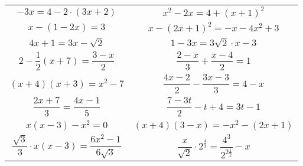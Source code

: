\documentclass[a4paper,12pt,leqno,fleqn]{article}
\begin{document}
\begin{tabularx}{\linewidth}{@{}XX@{}}

  \begin{equation}
    -3x=4-2\cdot(3x+2)
  \end{equation}
&
  \begin{equation}
    x^2-2x=4+(x+1)^2
  \end{equation}
\\
  \begin{equation}
    x-(1-2x)=3
  \end{equation}
&
  \begin{equation}
    x-(2x+1)^2=-x-4x^2+3
  \end{equation}
\\
  \begin{equation}
    4x+1=3x-\sqrt{2}
  \end{equation}
&
  \begin{equation}
    1-3x=3\sqrt{2}\cdot x-3
  \end{equation}
\\
  \begin{equation}
    2-\frac{1}{2}(x+7)=\frac{3-x}{2}
  \end{equation}
&
  \begin{equation}
    \frac{2-x}{3}+\frac{x-4}{2}=1
  \end{equation}
\\
  \begin{equation}
    (x+4)(x+3)=x^2-7
  \end{equation}
&
  \begin{equation}
    \frac{4x-2}{2}-\frac{3x-3}{3}=4-x
  \end{equation}
\\
  \begin{equation}
    \frac{2x+7}{3}=\frac{4x-1}{5}
  \end{equation}
&
  \begin{equation}
    \frac{7-3t}{2}-t+4=3t-1
  \end{equation}
\\
  \begin{equation}
    x(x-3)-x^2=0
  \end{equation}
&
  \begin{equation}
    (x+4)(3-x)=-x^2-(2x+1)
  \end{equation}
\\
  \begin{equation}
    \frac{\sqrt{3}}{3}\cdot x(x-3)=\frac{6x^2-1}{6\sqrt{3}}
  \end{equation}
&
  \begin{equation}
    \frac{x}{\sqrt{2}}\cdot 2^{\frac{4}{3}}=\frac{4^{3}}{2^{2\frac{1}{2}}}-x
  \end{equation}
\\
\end{tabularx}
\end{document}
